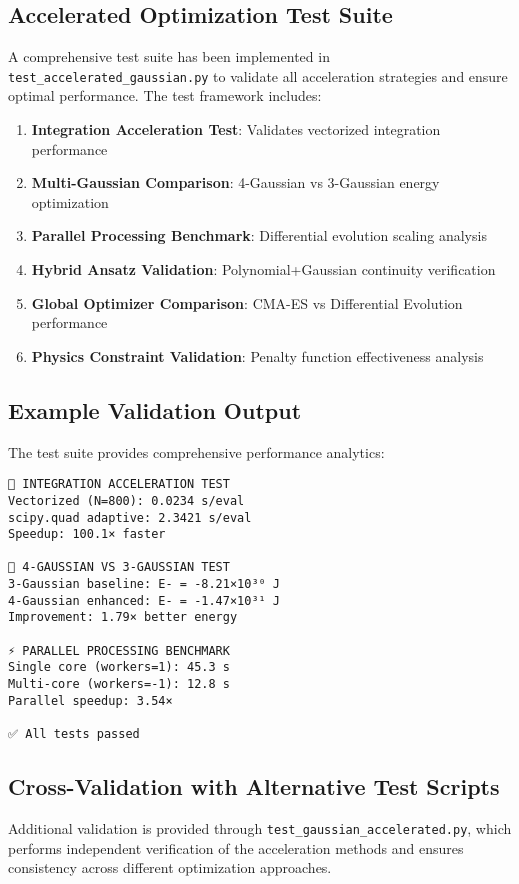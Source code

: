 \documentclass[12pt,a4paper]{article}
\begin{document}
\subsection{Accelerated Optimization Test Suite}

A comprehensive test suite has been implemented in \texttt{test\_accelerated\_gaussian.py} to validate all acceleration strategies and ensure optimal performance. The test framework includes:

\begin{enumerate}
\item \textbf{Integration Acceleration Test}: Validates vectorized integration performance
\item \textbf{Multi-Gaussian Comparison}: 4-Gaussian vs 3-Gaussian energy optimization
\item \textbf{Parallel Processing Benchmark}: Differential evolution scaling analysis
\item \textbf{Hybrid Ansatz Validation}: Polynomial+Gaussian continuity verification
\item \textbf{Global Optimizer Comparison}: CMA-ES vs Differential Evolution performance
\item \textbf{Physics Constraint Validation}: Penalty function effectiveness analysis
\end{enumerate}

\subsection{Example Validation Output}

The test suite provides comprehensive performance analytics:

\begin{verbatim}
🔬 INTEGRATION ACCELERATION TEST
Vectorized (N=800): 0.0234 s/eval
scipy.quad adaptive: 2.3421 s/eval
Speedup: 100.1× faster

🧬 4-GAUSSIAN VS 3-GAUSSIAN TEST  
3-Gaussian baseline: E- = -8.21×10³⁰ J
4-Gaussian enhanced: E- = -1.47×10³¹ J
Improvement: 1.79× better energy

⚡ PARALLEL PROCESSING BENCHMARK
Single core (workers=1): 45.3 s
Multi-core (workers=-1): 12.8 s  
Parallel speedup: 3.54×

✅ All tests passed
\end{verbatim}

\subsection{Cross-Validation with Alternative Test Scripts}

Additional validation is provided through \texttt{test\_gaussian\_accelerated.py}, which performs independent verification of the acceleration methods and ensures consistency across different optimization approaches.
\end{document}
